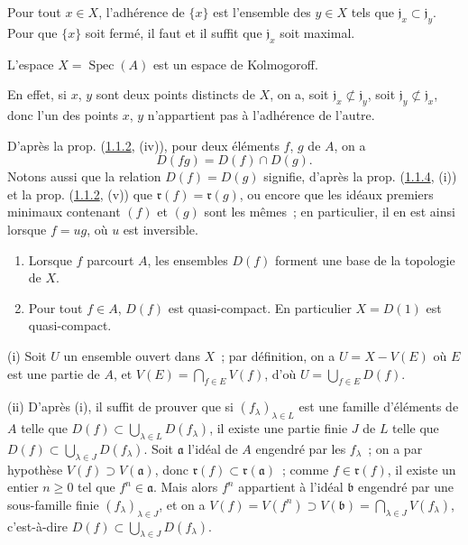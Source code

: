 \begin{corollary}[1.1.7]
\label{I.1.1.7-fr}
Pour tout $x\in X$, l'adhérence de $\{x\}$ est l'ensemble des $y\in X$ tels
que $\mathfrak{j}_x\subset\mathfrak{j}_y$. Pour que $\{x\}$ soit fermé, il
faut et il suffit que $\mathfrak{j}_x$ soit maximal.
\end{corollary}

\begin{corollary}[1.1.8]
\label{I.1.1.8-fr}
L'espace $X=\operatorname{Spec}(A)$ est un espace de Kolmogoroff.
\end{corollary}

En effet, si $x$, $y$ sont deux points distincts de $X$, on a, soit
$\mathfrak{j}_x\not\subset\mathfrak{j}_y$, soit
$\mathfrak{j}_y\not\subset\mathfrak{j}_x$, donc l'un des points $x$, $y$
n'appartient pas à l'adhérence de l'autre.

\begin{env}[1.1.9]
\label{I.1.1.9-fr}
D'après la prop. (\hyperref[I.1.1.2-fr]{1.1.2}, (iv)), pour deux éléments
$f$, $g$ de $A$, on a
\begin{equation}
  D(fg)=D(f)\cap D(g).
  \tag{1.1.9.1}\label{I.1.1.9.1-fr}
\end{equation}
Notons aussi que la relation $D(f)=D(g)$ signifie, d'après la prop.
(\hyperref[I.1.1.4-fr]{1.1.4}, (i)) et la prop.
(\hyperref[I.1.1.2-fr]{1.1.2}, (v)) que
$\mathfrak{r}(f)=\mathfrak{r}(g)$, ou encore que les idéaux premiers minimaux
contenant $(f)$ et $(g)$ sont les mêmes~; en particulier, il en est ainsi
lorsque $f=ug$, où $u$ est inversible.
\end{env}

\begin{proposition}[1.1.10]
\label{I.1.1.10-fr}
\begin{enumerate}
  \item[\rm(i)] Lorsque $f$ parcourt $A$, les ensembles $D(f)$ forment une
  base de la topologie de $X$.
  \item[\rm(ii)] Pour tout $f\in A$, $D(f)$ est quasi-compact. En particulier
  $X=D(1)$ est quasi-compact.
\end{enumerate}
\end{proposition}

(i) Soit $U$ un ensemble ouvert dans $X$~; par définition, on a
$U=X-V(E)$ où $E$ est une partie de $A$, et
$V(E)=\bigcap_{f\in E}V(f)$, d'où $U=\bigcup_{f\in E}D(f)$.

(ii) D'après (i), il suffit de prouver que si $(f_\lambda)_{\lambda\in L}$
est une famille d'éléments de $A$ telle que
$D(f)\subset\bigcup_{\lambda\in L}D(f_\lambda)$, il existe une partie finie
$J$ de $L$ telle que $D(f)\subset\bigcup_{\lambda\in J}D(f_\lambda)$. Soit
$\mathfrak{a}$ l'idéal de $A$ engendré par les $f_\lambda$~; on a par
hypothèse $V(f)\supset V(\mathfrak{a})$, donc
$\mathfrak{r}(f)\subset\mathfrak{r}(\mathfrak{a})$~; comme
$f\in\mathfrak{r}(f)$, il existe un entier $n\geq0$ tel que
$f^n\in\mathfrak{a}$. Mais alors $f^n$ appartient à l'idéal $\mathfrak{b}$
engendré par une sous-famille finie $(f_\lambda)_{\lambda\in J}$, et on a
$V(f)=V(f^n)\supset V(\mathfrak{b})=\bigcap_{\lambda\in J}V(f_\lambda)$,
c'est-à-dire $D(f)\subset\bigcup_{\lambda\in J}D(f_\lambda)$.

